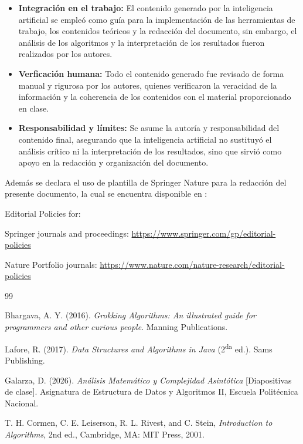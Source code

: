 \documentclass[pdflatex,sn-mathphys-num]{sn-jnl}%
\theoremstyle{thmstyleone}%
\theoremstyle{thmstyletwo}%
\theoremstyle{thmstylethree}%
\begin{document}
\begin{itemize}
\\
\item \textbf{Integración en el trabajo:} 
El contenido generado por la inteligencia artificial se empleó como guía para la implementación de las herramientas de trabajo, los contenidos teóricos y la redacción del documento, sin embargo, el análisis de los algoritmos y la interpretación de los resultados fueron realizados por los autores. \\
\item \textbf{Verficación humana:} 
Todo el contenido generado fue revisado de forma manual y rigurosa por los autores, quienes verificaron la veracidad de la información y la coherencia de los contenidos con el material proporcionado en clase. \\
\item \textbf{Responsabilidad y límites:}
Se asume la autoría y responsabilidad del contenido final, asegurando que la inteligencia artificial no sustituyó el análisis crítico ni la interpretación de los resultados, sino que sirvió como apoyo en la redacción y organización del documento. \\
\end{itemize}

\noindent
Adem\'as se declara el uso de plantilla de Springer Nature para la redacción del presente documento, la cual se encuentra disponible en :

\bigskip
\begin{flushleft}%
Editorial Policies for:

\bigskip\noindent
Springer journals and proceedings: \url{https://www.springer.com/gp/editorial-policies}

\bigskip\noindent
Nature Portfolio journals: \url{https://www.nature.com/nature-research/editorial-policies}
\end{flushleft}


\begin{thebibliography}{99}

Bhargava, A. Y. (2016). \textit{Grokking Algorithms: An illustrated guide for programmers and other curious people}. Manning Publications.

Lafore, R. (2017). \textit{Data Structures and Algorithms in Java} (2\textsuperscript{da} ed.). Sams Publishing.

Galarza, D. (2026). \textit{Análisis Matemático y Complejidad Asintótica} [Diapositivas de clase]. Asignatura de Estructura de Datos y Algoritmos II, Escuela Politécnica Nacional.

T. H. Cormen, C. E. Leiserson, R. L. Rivest, and C. Stein, \textit{Introduction to Algorithms}, 2nd ed., Cambridge, MA: MIT Press, 2001.

\end{thebibliography}
\end{document}
